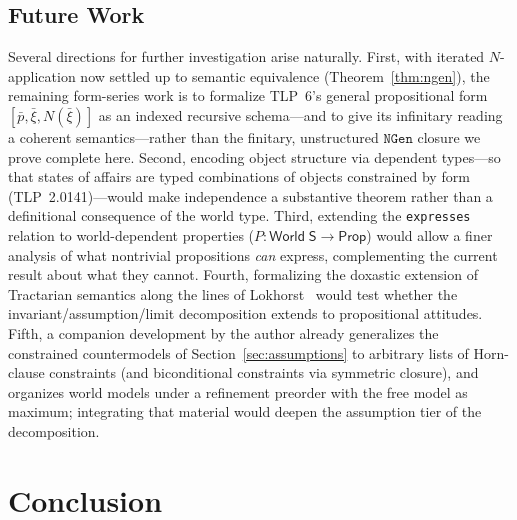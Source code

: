 \documentclass[jsl,bibother]{asl}
\theoremstyle{definition}
\theoremstyle{remark}
\newcommand{\Sach}{\mathsf{S}}
\newcommand{\World}{\mathsf{World}}
\newcommand{\Prop}{\mathsf{Prop}}
\begin{document}
\subsection{Future Work}
\label{sec:future}

Several directions for further investigation arise naturally.
First, with iterated $N$-application now settled up to
semantic equivalence (Theorem~\ref{thm:ngen}), the remaining
form-series work is to formalize TLP~6's general propositional
form $[\bar{p}, \bar{\xi}, N(\bar{\xi})]$ as an indexed
recursive schema---and to give its infinitary reading a
coherent semantics---rather than the finitary, unstructured
$\mathtt{NGen}$ closure we prove complete here.
Second, encoding object structure via dependent types---so
that states of affairs are typed combinations of objects
constrained by form (TLP~2.0141)---would make independence
a substantive theorem rather than a definitional consequence
of the world type.
Third, extending the \texttt{expresses} relation to
world-dependent properties ($P : \World\;\Sach \to \Prop$)
would allow a finer analysis of what nontrivial propositions
\emph{can} express, complementing the current result about
what they cannot.
Fourth, formalizing the doxastic extension of Tractarian
semantics along the lines of Lokhorst~\cite{lokhorst1988}
would test whether the invariant/assumption/limit decomposition
extends to propositional attitudes.
Fifth, a companion development by the author already generalizes
the constrained countermodels of Section~\ref{sec:assumptions}
to arbitrary lists of Horn-clause constraints (and biconditional
constraints via symmetric closure), and organizes world models
under a refinement preorder with the free model as maximum;
integrating that material would deepen the assumption tier of
the decomposition.

\section{Conclusion}
\label{sec:conclusion}
\end{document}
